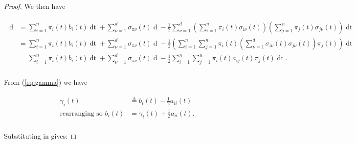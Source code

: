 \documentclass[british]{amsart} \usepackage{lmodern}
\numberwithin{equation}{section} \numberwithin{figure}{section}
\theoremstyle{plain} \newtheorem{thm}{\protect\theoremname}[section]
\theoremstyle{definition} \newtheorem{defn}[thm]{\protect\definitionname}
\theoremstyle{plain} \newtheorem{assumption}[thm]{\protect\assumptionname}
\theoremstyle{plain} \newtheorem{lem}[thm]{\protect\lemmaname}
\theoremstyle{plain} \newtheorem{prop}[thm]{\protect\propositionname}
\theoremstyle{remark} \newtheorem{rem}[thm]{\protect\remarkname}
\theoremstyle{plain} \newtheorem{cor}[thm]{\protect\corollaryname}
\renewcommand{\d}[1]{\mathop{\mathrm{d}{#1}}}
\newcommand{\defeq}{\mathop{\triangleq}} \newcommand{\almostsurely}{\text{a.s.}}
\newcommand{\V}{V^{w,\pi}}
\begin{document}
\begin{proof}
  We then have
  
  \begin{gather*}
    \begin{split}
      \d{\log{\V(t)}} 
        &= \sum_{i=1}^{n} \pi_{i}(t) b_{i}(t) \d{t} 
            + \sum_{\nu=1}^d \sigma_{\pi\nu}(t) \d{W_{\nu}(t)} 
            - \frac{1}{2} \sum_{\nu=1}^{d}
                \left( \sum_{i=1}^{n} \pi_{i}(t) \sigma_{i\nu}(t) \right) 
                \left( \sum_{j=1}^{n} \pi_{j}(t) \sigma_{j\nu}(t) \right) 
              \d{t} \\
        &= \sum_{i=1}^{n} \pi_{i}(t) b_{i}(t) \d{t} 
            + \sum_{\nu=1}^d \sigma_{\pi\nu}(t) \d{W_{\nu}(t)} 
            - \frac{1}{2} \left( \sum_{i=1}^{n} \sum_{j=1}^{n} \pi_{i}(t) 
              \left( 
                \sum_{\nu=1}^{d} \sigma_{i\nu}(t) \sigma_{j\nu}(t) 
              \right) \pi_{j}(t) \right) \d{t} \\
        &= \sum_{i=1}^{n} \pi_{i}(t) b_{i}(t) \d{t} 
            + \sum_{\nu=1}^d \sigma_{\pi\nu}(t) \d{W_{\nu}(t)} 
            - \frac{1}{2} \sum_{i=1}^{n} \sum_{j=1}^{n} \pi_{i}(t) a_{ij}(t) \pi_{j}(t) \d{t}. \\
   \end{split}
  \end{gather*}

  From (\ref{eq:gamma}) we have

  \begin{gather*}
    \begin{split}
      \gamma_{i}(t) & \defeq b_{i}(t) - \frac{1}{2}a_{ii}(t) \\
       \text{rearranging so } b_{i}(t) &= \gamma_{i}(t) + \frac{1}{2}a_{ii}(t). \\
    \end{split}
  \end{gather*}

  Substituting in gives:


\end{proof}
\end{document}
